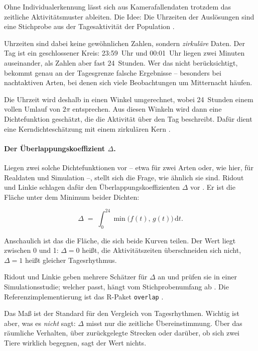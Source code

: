 \documentclass[12pt,a4paper]{report}
\begin{document}
Ohne Individualerkennung lässt sich aus Kamerafallendaten trotzdem das zeitliche
Aktivitätsmuster ableiten. Die Idee: Die Uhrzeiten der Auslösungen sind eine Stichprobe aus
der Tagesaktivität der Population \cite{Rowcliffe2014}.

Uhrzeiten sind dabei keine gewöhnlichen Zahlen, sondern \emph{zirkuläre} Daten. Der Tag ist
ein geschlossener Kreis: 23:59~Uhr und 00:01~Uhr liegen zwei Minuten auseinander, als Zahlen
aber fast 24~Stunden. Wer das nicht berücksichtigt, bekommt genau an der Tagesgrenze falsche
Ergebnisse -- besonders bei nachtaktiven Arten, bei denen sich viele Beobachtungen um
Mitternacht häufen.

Die Uhrzeit wird deshalb in einen Winkel umgerechnet, wobei 24~Stunden einem vollen Umlauf
von $2\pi$ entsprechen. Aus diesen Winkeln wird dann eine Dichtefunktion geschätzt, die die
Aktivität über den Tag beschreibt. Dafür dient eine Kerndichteschätzung mit einem
zirkulären Kern \cite{RidoutLinkie2009}.

\paragraph{Der Überlappungskoeffizient $\Delta$.}

Liegen zwei solche Dichtefunktionen vor -- etwa für zwei Arten oder, wie hier, für Realdaten
und Simulation --, stellt sich die Frage, wie ähnlich sie sind. Ridout und Linkie schlagen
dafür den Überlappungskoeffizienten $\Delta$ vor \cite{RidoutLinkie2009}. Er ist die Fläche
unter dem Minimum beider Dichten:

\begin{equation}
    \Delta \;=\; \int_{0}^{24} \min\bigl(f(t),\, g(t)\bigr)\, \mathrm{d}t .
    \label{eq:delta}
\end{equation}

Anschaulich ist das die Fläche, die sich beide Kurven teilen. Der Wert liegt zwischen 0
und 1: $\Delta = 0$ heißt, die Aktivitätszeiten überschneiden sich nicht, $\Delta = 1$ heißt
gleicher Tagesrhythmus.

Ridout und Linkie geben mehrere Schätzer für $\Delta$ an und prüfen sie in einer
Simulationsstudie; welcher passt, hängt vom Stichprobenumfang ab \cite{RidoutLinkie2009}.
Die Referenzimplementierung ist das R-Paket \texttt{overlap} \cite{Meredith2016}.

Das Maß ist der Standard für den Vergleich von Tagesrhythmen. Wichtig ist aber, was es
\emph{nicht} sagt: $\Delta$ misst nur die zeitliche Übereinstimmung. Über das räumliche
Verhalten, über zurückgelegte Strecken oder darüber, ob sich zwei Tiere wirklich begegnen,
sagt der Wert nichts.
\end{document}
